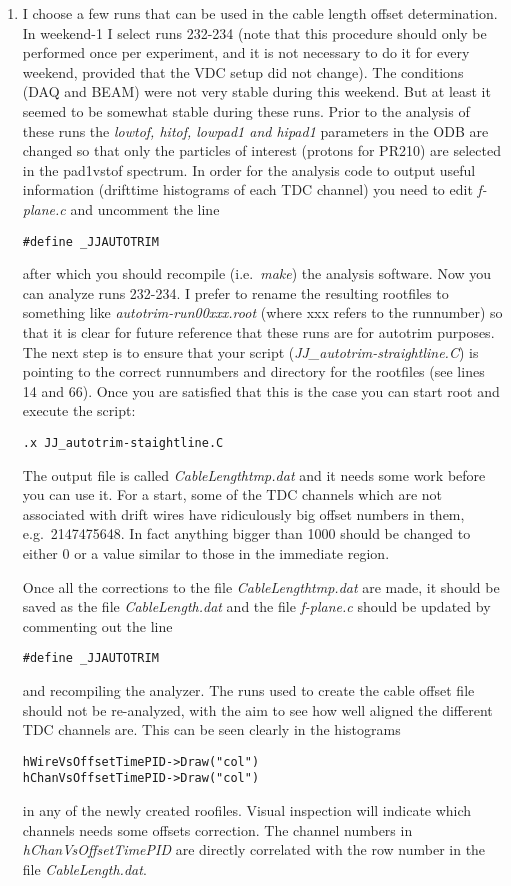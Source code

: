 \documentclass[11pt]{report}
\begin{document}
\begin{enumerate}
\item 
I choose a few runs that can be used in the cable length offset determination. In weekend-1
I select runs 232-234 (note that this procedure should only be performed once per experiment, and
it is not necessary to do it for every weekend, provided that the VDC setup did not change).
The conditions (DAQ and BEAM) were not very stable during this weekend.
But at least it seemed to be somewhat stable during these runs.
Prior to the analysis of these runs the {\it lowtof, hitof, lowpad1 and hipad1} parameters in the ODB  
are changed so that only the particles of interest (protons for PR210)  are selected in the pad1vstof spectrum.
In order for the analysis code to output useful information (drifttime histograms of each
TDC channel) you need to edit {\it f-plane.c} and uncomment the line
\begin{verbatim} 
#define _JJAUTOTRIM
\end{verbatim}
after which you should recompile (i.e.~{\it make}) the analysis software.
Now you can analyze runs 232-234. 
I prefer to rename the resulting rootfiles to something like {\it autotrim-run00xxx.root}
(where xxx refers to the runnumber) so that it is clear
for future reference that these runs are for autotrim purposes.
%
The next step is to ensure that your script ({\it JJ\_autotrim-straightline.C})
is pointing to the correct runnumbers and directory for the rootfiles (see lines 14 and 66).
Once you are satisfied that this is the case you can start root and execute the script:
\begin{verbatim} 
.x JJ_autotrim-staightline.C 
\end{verbatim}
The output file is called {\it CableLengthtmp.dat}
and it needs some work before you can use it.
For a start, some of the TDC channels which are not associated with drift wires have
ridiculously big offset numbers in them, e.g.~2147475648.
In fact anything bigger than 1000 should be changed to either 0 or a value similar to those
in the immediate region.

Once all the corrections to the file {\it CableLengthtmp.dat}
are made, it should be saved as the file {\it CableLength.dat} and the file
{\it f-plane.c} should be updated by commenting out the line
\begin{verbatim} 
#define _JJAUTOTRIM
\end{verbatim}
and recompiling the analyzer. The runs used to create the cable offset file
should not be re-analyzed, with the aim to see how well aligned the different
TDC channels are. This can be seen clearly in the histograms
\begin{verbatim} 
hWireVsOffsetTimePID->Draw("col")
hChanVsOffsetTimePID->Draw("col")
\end{verbatim}
in any of the newly created roofiles. Visual inspection will indicate which channels
needs some offsets correction. The channel numbers in {\it hChanVsOffsetTimePID}
are directly correlated with the row number in the file  {\it CableLength.dat}.


\end{enumerate}
\end{document}
